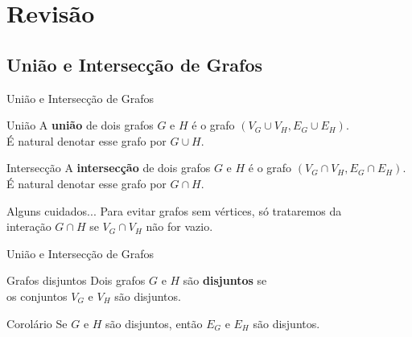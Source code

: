 \documentclass[xcolor=dvipsnames,table]{beamer}
\begin{document}
    \section{Revisão}
	\subsection{União e Intersecção de Grafos}
	\begin{frame}{União e Intersecção de Grafos}
		\begin{block}{União}
			A {\bf união} de dois grafos $G$ e $H$ é o grafo $(V_G \cup V_H, E_G \cup E_H)$. \\É natural denotar esse grafo por $G \cup H$.
		\end{block}  
		\begin{block}{Intersecção}
			A {\bf intersecção} de dois grafos $G$ e $H$ é o grafo $(V_G \cap V_H, E_G \cap E_H)$. É natural denotar esse grafo por $G \cap H$.
		\end{block}  
		\begin{alertblock}{Alguns cuidados...}
			Para evitar grafos sem vértices, só trataremos da \\interação $G \cap H$ se $V_G \cap V_H$ não for vazio.
		\end{alertblock}
	\end{frame}
	
	\begin{frame}{União e Intersecção de Grafos}
		\begin{block}{Grafos disjuntos}
			Dois grafos $G$ e $H$ são {\bf disjuntos} se \\os conjuntos $V_G$ e $V_H$ são disjuntos.
		\end{block}  
		\begin{block}{Corolário}
			Se $G$ e $H$ são disjuntos, então $E_G$ e $E_H$ são disjuntos.
		\end{block}
	\end{frame}
\end{document}
